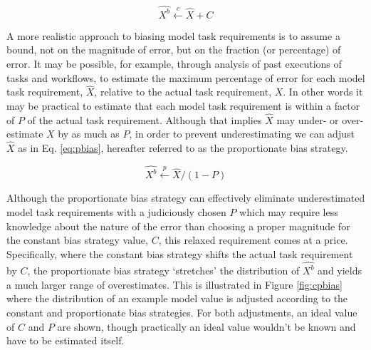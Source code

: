\documentclass[10pt]{csce}
\begin{document}
\begin{equation}
\hat{X^b} \xleftarrow{c} \hat{X} + C
\label{eq:cbias}
\end{equation}

A more realistic approach to biasing model task requirements is to assume a
bound, not on the magnitude of error, but on the fraction (or percentage) of
error. It may be possible, for example, through analysis of past executions of
tasks and workflows, to estimate the maximum percentage of error for each model
task requirement, $\hat{X}$, relative to the actual task requirement, $X$. In
other words it may be practical to estimate that each model task requirement is
within a factor of $P$ of the actual task requirement.  Although that implies $\hat{X}$
may under- or over-estimate $X$ by as much as $P$, in order to prevent
underestimating we can adjust $\hat{X}$ as in Eq. \ref{eq:pbias}, hereafter
referred to as the proportionate bias strategy.

\begin{equation}
\hat{X^b} \xleftarrow{p} \hat{X} / (1 - P)
\label{eq:pbias}
\end{equation}

Although the proportionate bias strategy can effectively eliminate
underestimated model task requirements with a judiciously chosen $P$
which may require less knowledge about the nature of the error than choosing
a proper magnitude for the constant bias strategy value, $C$, this relaxed
requirement comes at a price. Specifically, where the constant bias
strategy shifts the actual task requirement by $C$, the proportionate bias
strategy `stretches' the distribution of $\hat{X^b}$ and yields a much larger
range of overestimates. This is illustrated in Figure \ref{fig:cpbias} where
the distribution of an example model value is adjusted according to the
constant and proportionate bias strategies.  For both adjustments, an ideal
value of $C$ and $P$ are shown, though practically an ideal value wouldn't be
known and have to be estimated itself.
\end{document}
